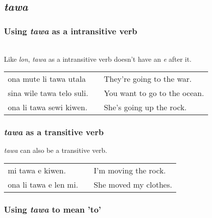 \subsection*{\textit{tawa}}
%
\subsubsection*{Using \textit{tawa} as a intransitive verb} \\
%
Like \textit{lon}, \textit{tawa} as a intransitive verb doesn't have an \textit{e} after it. \\

\begin{supertabular}{p{5,5cm}|ll}
ona mute li tawa utala && They're going to the war. \\
sina wile tawa telo suli. && You want to go to the ocean. \\
ona li tawa sewi kiwen. && She's going up the rock. \\
\end{supertabular} 

\subsubsection*{\textit{tawa} as a transitive verb}
%
\textit{tawa} can also be a transitive verb.

\begin{supertabular}{p{5,5cm}|ll}
mi tawa e kiwen. && I'm moving the rock. \\
ona li tawa e len mi. && She moved my clothes. \\
\end{supertabular} 

%
\subsubsection*{Using \textit{tawa} to mean 'to'}
%

